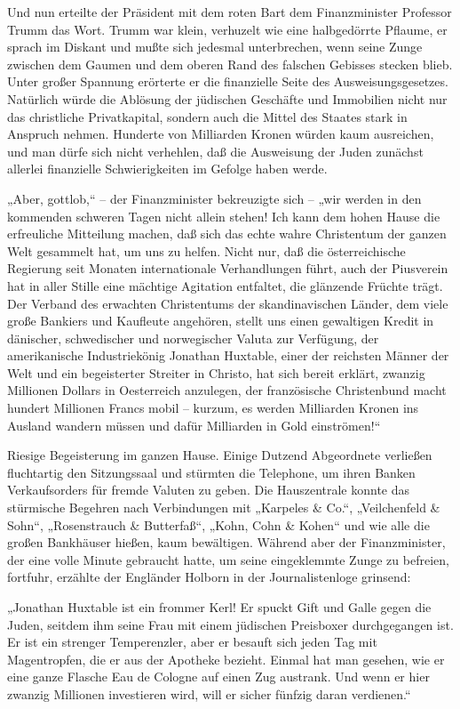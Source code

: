 Und nun erteilte der Präsident mit dem roten Bart dem
Finanzminister Professor Trumm das Wort. Trumm war klein, verhuzelt
wie eine halbgedörrte Pflaume, er sprach im Diskant und mußte sich
jedesmal unterbrechen, wenn seine Zunge zwischen dem Gaumen und dem
oberen Rand des falschen Gebisses stecken blieb. Unter großer
Spannung erörterte er die finanzielle Seite des
Ausweisungsgesetzes. Natürlich würde die Ablösung der jüdischen
Geschäfte und Immobilien nicht nur das christliche Privatkapital,
sondern auch die Mittel des Staates stark in Anspruch nehmen.
Hunderte von Milliarden Kronen würden kaum ausreichen, und man
dürfe sich nicht verhehlen, daß die Ausweisung der Juden zunächst
allerlei finanzielle Schwierigkeiten im Gefolge haben werde.

„Aber, gottlob,“ – der Finanzminister bekreuzigte sich – „wir
werden in den kommenden schweren Tagen nicht allein stehen! Ich
kann dem hohen Hause die erfreuliche Mitteilung machen, daß sich
das echte wahre Christentum der ganzen Welt gesammelt hat, um uns
zu helfen. Nicht nur, daß die österreichische Regierung seit
Monaten internationale Verhandlungen führt, auch der Piusverein hat
 in aller Stille eine mächtige Agitation entfaltet,
die glänzende Früchte trägt. Der Verband des erwachten Christentums
der skandinavischen Länder, dem viele große Bankiers und Kaufleute
angehören, stellt uns einen gewaltigen Kredit in dänischer,
schwedischer und norwegischer Valuta zur Verfügung, der
amerikanische Industriekönig Jonathan Huxtable, einer der reichsten
Männer der Welt und ein begeisterter Streiter in Christo, hat sich
bereit erklärt, zwanzig Millionen Dollars in Oesterreich anzulegen,
der französische Christenbund macht hundert Millionen Francs mobil
– kurzum, es werden Milliarden Kronen ins Ausland wandern müssen
und dafür Milliarden in Gold einströmen!“

Riesige Begeisterung im ganzen Hause. Einige Dutzend Abgeordnete
verließen fluchtartig den Sitzungssaal und stürmten die Telephone,
um ihren Banken Verkaufsorders für fremde Valuten zu geben. Die
Hauszentrale konnte das stürmische Begehren nach Verbindungen mit
„Karpeles \& Co.“, „Veilchenfeld \& Sohn“, „Rosenstrauch \&
Butterfaß“, „Kohn, Cohn \& Kohen“ und wie alle die großen
Bankhäuser hießen, kaum bewältigen. Während aber der
Finanzminister, der eine volle Minute gebraucht hatte, um seine
eingeklemmte Zunge zu befreien, fortfuhr, erzählte der Engländer
Holborn in der Journalistenloge grinsend:

„Jonathan Huxtable ist ein frommer Kerl! Er spuckt Gift und Galle
gegen die Juden, seitdem ihm seine Frau mit einem jüdischen
Preisboxer durchgegangen ist. Er ist ein strenger Temperenzler,
aber er besauft sich jeden Tag mit Magentropfen, die er aus der
Apotheke bezieht. Einmal  hat man gesehen, wie er
eine ganze Flasche Eau de Cologne auf einen Zug austrank. Und wenn
er hier zwanzig Millionen investieren wird, will er sicher fünfzig
daran verdienen.“

